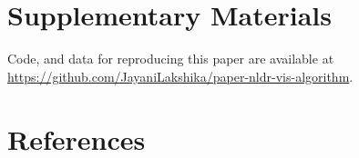 \documentclass[
  12pt]{article}
\begin{document}
\section{Supplementary Materials}\label{supplementary-materials}

Code, and data for reproducing this paper are available at
\url{https://github.com/JayaniLakshika/paper-nldr-vis-algorithm}.

\section*{References}\label{references}

\renewcommand{\bibsection}{}


\newpage{}
\end{document}
